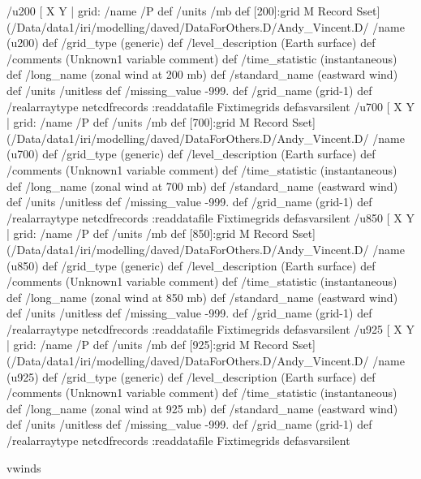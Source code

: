 \begin{ingrid}
/u200{
[  X Y | grid:
       /name /P def
       /units /mb def
       [200]:grid M Record Sset] (/Data/data1/iri/modelling/daved/DataForOthers.D/Andy_Vincent.D/%
/name (u200) def
 /grid_type (generic) def
 /level_description (Earth surface) def
 /comments (Unknown1 variable comment) def
 /time_statistic (instantaneous) def
 /long_name (zonal wind at 200 mb) def
/standard_name (eastward wind) def
 /units /unitless def
 /missing_value -999. def
 /grid_name (grid-1) def
 /realarraytype netcdfrecords :readdatafile Fixtimegrids
}defasvarsilent
 /u700{
[  X Y | grid:
       /name /P def
       /units /mb def
       [700]:grid M Record Sset] (/Data/data1/iri/modelling/daved/DataForOthers.D/Andy_Vincent.D/%
/name (u700) def
 /grid_type (generic) def
 /level_description (Earth surface) def
 /comments (Unknown1 variable comment) def
 /time_statistic (instantaneous) def
 /long_name (zonal wind at 700 mb) def
/standard_name (eastward wind) def
 /units /unitless def
 /missing_value -999. def
 /grid_name (grid-1) def
 /realarraytype netcdfrecords :readdatafile Fixtimegrids
}defasvarsilent
 /u850{
[  X Y | grid:
       /name /P def
       /units /mb def
       [850]:grid M Record Sset] (/Data/data1/iri/modelling/daved/DataForOthers.D/Andy_Vincent.D/%
/name (u850) def
 /grid_type (generic) def
 /level_description (Earth surface) def
 /comments (Unknown1 variable comment) def
 /time_statistic (instantaneous) def
 /long_name (zonal wind at 850 mb) def
/standard_name (eastward wind) def
 /units /unitless def
 /missing_value -999. def
 /grid_name (grid-1) def
 /realarraytype netcdfrecords :readdatafile Fixtimegrids
}defasvarsilent
 /u925{
[  X Y | grid:
       /name /P def
       /units /mb def
       [925]:grid  M Record Sset] (/Data/data1/iri/modelling/daved/DataForOthers.D/Andy_Vincent.D/%
/name (u925) def
 /grid_type (generic) def
 /level_description (Earth surface) def
 /comments (Unknown1 variable comment) def
 /time_statistic (instantaneous) def
 /long_name (zonal wind at 925 mb) def
/standard_name (eastward wind) def
 /units /unitless def
 /missing_value -999. def
 /grid_name (grid-1) def
 /realarraytype netcdfrecords :readdatafile Fixtimegrids
}defasvarsilent
\end{ingrid}
vwinds
